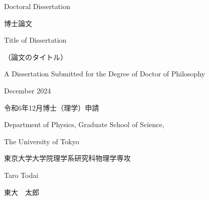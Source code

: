 \documentclass[12pt, a4paper, openright, twoside]{book}
\begin{document}
\begin{center}
    \Large Doctoral Dissertation \par
    \Large 博士論文 \par
    \vspace{15mm}
    \Large Title of Dissertation \par
    \vspace{5mm}
    \large （論文のタイトル） \par
    \vspace{15mm}
    \Large A Dissertation Submitted for the Degree of Doctor of Philosophy \par
    \Large December 2024 \par
    \Large 令和6年12月博士（理学）申請 \par
    \vspace{15mm}
    \Large  Department of Physics, Graduate School of Science, \par
    \Large The University of Tokyo \par
    \Large 東京大学大学院理学系研究科物理学専攻 \par
    \vspace{15mm}
    \Large Taro Todai \par
    \Large 東大　太郎
  \end{center}
  \thispagestyle{empty}
  \newpage
  ~
  \thispagestyle{empty}
  \newpage
  \restoregeometry

    \pagestyle{plain}

    

    \tableofcontents

    

    
    

    \appendix
    
    

    

    \printbibliography
\end{document}
